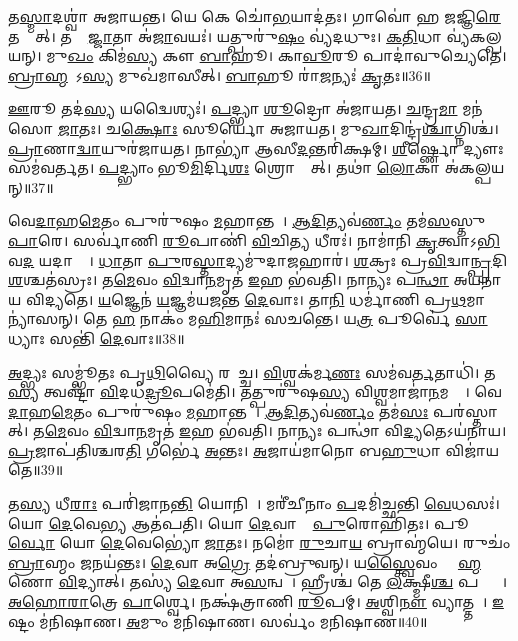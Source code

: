 𑌤\ul{𑌸𑍍𑌮𑌾}𑌦𑌶𑍍𑌵𑌾॑ 𑌅𑌜𑌾𑌯𑌨𑍍𑌤। 
𑌯𑍇 𑌕𑍇 𑌚𑍋॑\ul{𑌭}𑌯𑌾𑌦॑𑌤𑌃। 
𑌗𑌾𑌵𑍋॑ 𑌹 𑌜𑌜𑍍𑌞𑌿\ul{𑌰𑍇} 𑌤𑌸𑍍𑌮𑌾᳚𑌤𑍍। 
𑌤𑌸𑍍𑌮𑌾᳚\ul{𑌜𑍍𑌜𑌾}𑌤𑌾 𑌅॑\ul{𑌜𑌾}𑌵𑌯𑌃॑। 
𑌯𑌤𑍍𑌪𑍁𑌰𑍁॑\ul{𑌷𑌂} 𑌵𑍍𑌯॑𑌦𑌧𑍁𑌃। 
\ul{𑌕}\ul{𑌤𑌿}𑌧𑌾 𑌵𑍍𑌯॑𑌕𑌲𑍍𑌪𑌯𑌨𑍍। 
𑌮𑍁\ul{𑌖𑌂} 𑌕𑌿𑌮॑\ul{𑌸𑍍𑌯} 𑌕𑍗 \ul{𑌬𑌾}𑌹𑍂। 
𑌕𑌾\ul{𑌵𑍂}𑌰𑍂 𑌪𑌾𑌦𑌾॑𑌵𑍁𑌚𑍍𑌯𑍇𑌤𑍇। 
\ul{𑌬𑍍𑌰𑌾}\ul{𑌹𑍍𑌮}𑌣𑍋᳚𑌽\ul{𑌸𑍍𑌯} 𑌮𑍁𑌖॑𑌮𑌾𑌸𑍀𑌤𑍍। 
\ul{𑌬𑌾}𑌹𑍂 𑌰𑌾॑\ul{𑌜}𑌨𑍍𑌯𑌃॑ \ul{𑌕𑍃}𑌤𑌃॥36॥

\ul{𑌊}𑌰𑍂 𑌤𑌦॑\ul{𑌸𑍍𑌯} 𑌯𑌦𑍍𑌵𑍈𑌶𑍍𑌯𑌃॑। 
\ul{𑌪}𑌦𑍍𑌭𑍍𑌯𑌾 \ul{𑌶𑍂}𑌦𑍍𑌰𑍋 𑌅॑𑌜𑌾𑌯𑌤। 
\ul{𑌚}𑌨𑍍𑌦𑍍𑌰\ul{𑌮𑌾} 𑌮𑌨॑𑌸𑍋 \ul{𑌜𑌾}𑌤𑌃। 
𑌚\ul{𑌕𑍍𑌷𑍋𑌃} 𑌸𑍂𑌰𑍍𑌯𑍋॑ 𑌅𑌜𑌾𑌯𑌤। 
𑌮𑍁\ul{𑌖𑌾}𑌦𑌿𑌨𑍍𑌦𑍍𑌰॑\ul{𑌶𑍍𑌚𑌾}𑌗𑍍𑌨𑌿𑌶𑍍𑌚॑। 
\ul{𑌪𑍍𑌰𑌾}𑌣𑌾\ul{𑌦𑍍𑌵𑌾}𑌯𑍁𑌰॑𑌜𑌾𑌯𑌤। 
𑌨𑌾𑌭𑍍𑌯𑌾॑ 𑌆𑌸𑍀\ul{𑌦}𑌨𑍍𑌤𑌰𑌿॑𑌕𑍍𑌷𑌮𑍍। 
\ul{𑌶𑍀}𑌰𑍍𑌷𑍍𑌣𑍋 𑌦𑍍𑌯𑍗𑌃 𑌸𑌮॑𑌵𑌰𑍍𑌤𑌤। 
\ul{𑌪}𑌦𑍍𑌭𑍍𑌯𑌾𑌂 𑌭𑍂\ul{𑌮𑌿}𑌰𑍍𑌦𑌿\ul{𑌶𑌃} 𑌶𑍍𑌰𑍋𑌤𑍍𑌰𑌾᳚𑌤𑍍। 
𑌤𑌥𑌾॑ \ul{𑌲𑍋}𑌕𑌾 𑌅॑𑌕𑌲𑍍𑌪𑌯𑌨𑍍॥37॥

𑌵𑍇\ul{𑌦𑌾}𑌹\ul{𑌮𑍇}𑌤𑌂 𑌪𑍁𑌰𑍁॑𑌷𑌂 \ul{𑌮}𑌹𑌾𑌨𑍍𑌤𑌮𑍍᳚। 
\ul{𑌆}\ul{𑌦𑌿}𑌤𑍍𑌯𑌵॑\ul{𑌰𑍍𑌣𑌂} 𑌤𑌮॑\ul{𑌸}𑌸𑍍𑌤𑍁 \ul{𑌪𑌾}𑌰𑍇। 
𑌸𑌰𑍍𑌵𑌾॑𑌣𑌿 \ul{𑌰𑍂}𑌪𑌾𑌣𑌿॑ \ul{𑌵𑌿}𑌚𑌿\ul{𑌤𑍍𑌯} 𑌧𑍀𑌰𑌃॑। 
𑌨𑌾𑌮𑌾॑𑌨𑌿 \ul{𑌕𑍃}𑌤𑍍𑌵𑌾𑌽\ul{𑌭𑌿}𑌵\ul{𑌦}\an{} 𑌯𑌦𑌾𑌸𑍍𑌤𑍇᳚। 
\ul{𑌧𑌾}𑌤𑌾 \ul{𑌪𑍁}𑌰\ul{𑌸𑍍𑌤𑌾}𑌦𑍍𑌯𑌮𑍁॑𑌦𑌾\ul{𑌜}𑌹𑌾𑌰॑। 
\ul{𑌶}𑌕𑍍𑌰𑌃 𑌪𑍍𑌰\ul{𑌵𑌿}𑌦𑍍𑌵𑌾\ul{𑌨𑍍𑌪𑍍𑌰}𑌦𑌿\ul{𑌶}𑌶𑍍𑌚𑌤॑𑌸𑍍𑌰𑌃। 
𑌤\ul{𑌮𑍇}𑌵𑌂 \ul{𑌵𑌿}𑌦𑍍𑌵𑌾\ul{𑌨}𑌮𑍃𑌤॑ \ul{𑌇}𑌹 𑌭॑𑌵𑌤𑌿। 
𑌨𑌾𑌨𑍍𑌯𑌃 𑌪\ul{𑌨𑍍𑌥𑌾} 𑌅𑌯॑𑌨𑌾𑌯 𑌵𑌿𑌦𑍍𑌯𑌤𑍇। 
\ul{𑌯}𑌜𑍍𑌞𑍇𑌨॑ \ul{𑌯}𑌜𑍍𑌞𑌮॑𑌯𑌜𑌨𑍍𑌤 \ul{𑌦𑍇}𑌵𑌾𑌃। 
𑌤𑌾\ul{𑌨𑌿} 𑌧𑌰𑍍𑌮𑌾॑𑌣𑌿 𑌪𑍍𑌰\ul{𑌥}𑌮𑌾𑌨𑍍𑌯𑌾॑𑌸𑌨𑍍। 
𑌤𑍇 \ul{𑌹} 𑌨𑌾𑌕𑌂॑ 𑌮\ul{𑌹𑌿}𑌮𑌾𑌨𑌃॑ 𑌸𑌚𑌨𑍍𑌤𑍇। 
𑌯\ul{𑌤𑍍𑌰} 𑌪𑍂𑌰𑍍𑌵𑍇॑ \ul{𑌸𑌾}𑌧𑍍𑌯𑌾𑌃 𑌸𑌨𑍍𑌤𑌿॑ \ul{𑌦𑍇}𑌵𑌾𑌃॥38॥

\ul{𑌅}𑌦𑍍𑌭𑍍𑌯𑌃 𑌸𑌮𑍍𑌭𑍂॑𑌤𑌃 𑌪𑍃\ul{𑌥𑌿}𑌵𑍍𑌯𑍈 𑌰𑌸𑌾᳚𑌚𑍍𑌚। 
\ul{𑌵𑌿}𑌶𑍍𑌵𑌕॑𑌰𑍍𑌮\ul{𑌣𑌃} 𑌸𑌮॑𑌵\ul{𑌰𑍍𑌤}𑌤𑌾𑌧𑌿॑। 
𑌤\ul{𑌸𑍍𑌯} 𑌤𑍍𑌵𑌷𑍍𑌟𑌾॑ \ul{𑌵𑌿}𑌦𑌧॑\ul{𑌦𑍍𑌰𑍂}𑌪𑌮𑍇॑𑌤𑌿। 
𑌤𑌤𑍍𑌪𑍁𑌰𑍁॑𑌷\ul{𑌸𑍍𑌯} 𑌵𑌿\ul{𑌶𑍍𑌵}𑌮𑌾𑌜𑌾॑\ul{𑌨}𑌮𑌗𑍍𑌰𑍇᳚। 
𑌵𑍇\ul{𑌦𑌾}𑌹\ul{𑌮𑍇}𑌤𑌂 𑌪𑍁𑌰𑍁॑𑌷𑌂 \ul{𑌮}𑌹𑌾𑌨𑍍𑌤𑌮𑍍᳚। 
\ul{𑌆}\ul{𑌦𑌿}𑌤𑍍𑌯𑌵॑\ul{𑌰𑍍𑌣𑌂} 𑌤𑌮॑\ul{𑌸𑌃} 𑌪𑌰॑𑌸𑍍𑌤𑌾𑌤𑍍। 
𑌤\ul{𑌮𑍇}𑌵𑌂 \ul{𑌵𑌿}𑌦𑍍𑌵𑌾\ul{𑌨}𑌮𑍃𑌤॑ \ul{𑌇}𑌹 𑌭॑𑌵𑌤𑌿। 
𑌨𑌾𑌨𑍍𑌯𑌃 𑌪𑌨𑍍𑌥𑌾॑ 𑌵𑌿\ul{𑌦𑍍𑌯}𑌤𑍇𑌽𑌯॑𑌨𑌾𑌯। 
\ul{𑌪𑍍𑌰}𑌜𑌾𑌪॑𑌤𑌿𑌶𑍍𑌚𑌰\ul{𑌤𑌿} 𑌗𑌰𑍍𑌭𑍇॑ \ul{𑌅}𑌨𑍍𑌤𑌃। 
\ul{𑌅}𑌜𑌾𑌯॑𑌮𑌾𑌨𑍋 𑌬\ul{𑌹𑍁}𑌧𑌾 𑌵𑌿𑌜𑌾॑𑌯𑌤𑍇॥39॥

𑌤\ul{𑌸𑍍𑌯} 𑌧𑍀\ul{𑌰𑌾𑌃} 𑌪𑌰𑌿॑𑌜𑌾𑌨\ul{𑌨𑍍𑌤𑌿} 𑌯𑍋𑌨𑌿𑌮𑍍᳚। 
𑌮𑌰𑍀॑𑌚𑍀𑌨𑌾𑌂 \ul{𑌪}𑌦𑌮𑌿॑𑌚𑍍𑌛𑌨𑍍𑌤𑌿 \ul{𑌵𑍇}𑌧𑌸𑌃॑। 
𑌯𑍋 \ul{𑌦𑍇}𑌵𑍇\ul{𑌭𑍍𑌯} 𑌆𑌤॑𑌪𑌤𑌿। 
𑌯𑍋 \ul{𑌦𑍇}𑌵𑌾𑌨𑌾𑌂᳚ \ul{𑌪𑍁}𑌰𑍋𑌹𑌿॑𑌤𑌃। 
𑌪𑍂\ul{𑌰𑍍𑌵𑍋} 𑌯𑍋 \ul{𑌦𑍇}𑌵𑍇𑌭𑍍𑌯𑍋॑ \ul{𑌜𑌾}𑌤𑌃। 
𑌨𑌮𑍋॑ \ul{𑌰𑍁}𑌚𑌾\ul{𑌯} 𑌬𑍍𑌰𑌾𑌹𑍍𑌮॑𑌯𑍇। 
𑌰𑍁𑌚𑌂॑ \ul{𑌬𑍍𑌰𑌾}𑌹𑍍𑌮𑌂 \ul{𑌜}𑌨𑌯॑𑌨𑍍𑌤𑌃। 
\ul{𑌦𑍇}𑌵𑌾 𑌅\ul{𑌗𑍍𑌰𑍇} 𑌤𑌦॑𑌬𑍍𑌰𑍁𑌵𑌨𑍍। 
𑌯\ul{𑌸𑍍𑌤𑍍𑌵𑍈}𑌵𑌂 𑌬𑍍𑌰𑌾᳚\ul{𑌹𑍍𑌮}𑌣𑍋 \ul{𑌵𑌿}𑌦𑍍𑌯𑌾𑌤𑍍। 
𑌤𑌸𑍍𑌯॑ \ul{𑌦𑍇}𑌵𑌾 𑌅\ul{𑌸}𑌨𑍍𑌵𑌶𑍇᳚। 
𑌹𑍍𑌰𑍀𑌶𑍍𑌚॑ 𑌤𑍇 \ul{𑌲}𑌕𑍍𑌷𑍍𑌮𑍀\ul{𑌶𑍍𑌚} 𑌪𑌤𑍍𑌨𑍍𑌯𑍗᳚। 
\ul{𑌅}\ul{𑌹𑍋}\ul{𑌰𑌾}𑌤𑍍𑌰𑍇 \ul{𑌪𑌾}𑌰𑍍𑌶𑍍𑌵𑍇। 
𑌨𑌕𑍍𑌷॑𑌤𑍍𑌰𑌾𑌣𑌿 \ul{𑌰𑍂}𑌪𑌮𑍍। 
\ul{𑌅}𑌶𑍍𑌵𑌿\ul{𑌨𑍗} 𑌵𑍍𑌯𑌾𑌤𑍍𑌤𑌮𑍍᳚। 
\ul{𑌇}𑌷𑍍𑌟𑌂 𑌮॑𑌨𑌿𑌷𑌾𑌣। 
\ul{𑌅}𑌮𑍁𑌂 𑌮॑𑌨𑌿𑌷𑌾𑌣। 
𑌸𑌰𑍍𑌵𑌂॑ 𑌮𑌨𑌿𑌷𑌾𑌣॥40॥
\anuvakamend[\ul{𑌜𑌾}\ul{𑌯}\ul{𑌤𑍇} 𑌵𑌶𑍇॑ \ul{𑌸}𑌪𑍍𑌤 𑌚॑]

